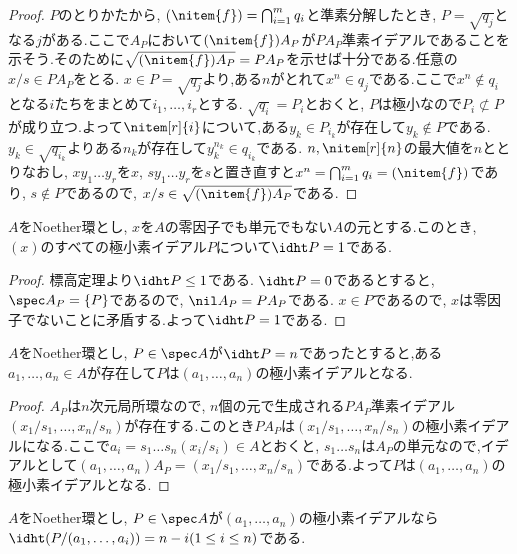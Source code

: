 \begin{proof}
	$P$のとりかたから, $(\nitem{f})=\bigcap_{i=1}^m q_i$と準素分解したとき, $P=\sqrt{q_j}$となる$j$がある.ここで$A_P$において$(\nitem{f})A_P$が$PA_P$準素イデアルであることを示そう.そのために$\sqrt{(\nitem{f})A_P}=PA_P$を示せば十分である.任意の$x/s\in PA_P$をとる. $x\in P=\sqrt{q_j}$より,ある$n$がとれて$x^n\in q_j$である.ここで$x^n\not\in q_i$となる$i$たちをまとめて$i_1,\dots,i_r$とする. $\sqrt{q_i}=P_i$とおくと, $P$は極小なので$P_i\not\subset P$が成り立つ.よって$\nitem[r]{i}$について,ある$y_k\in P_{i_k}$が存在して$y_k\not\in P$である. $y_k\in\sqrt{q_{i_k}}$よりある$n_k$が存在して$y_k^{n_k}\in q_{i_k}$である. $n,\nitem[r]{n}$の最大値を$n$ととりなおし, $xy_1\dots y_r$を$x$, $sy_1\dots y_r$を$s$と置き直すと$x^n=\bigcap_{i=1}^m q_i=(\nitem{f})$であり, $s\not\in P$であるので, $x/s\in\sqrt{(\nitem{f})A_P}$である.
\end{proof}

\begin{cor}
	$A$をNoether環とし, $x$を$A$の零因子でも単元でもない$A$の元とする.このとき, $(x)$のすべての極小素イデアル$P$について$\idht P=1$である.
\end{cor}

\begin{proof}
	標高定理より$\idht P\leq1$である. $\idht P=0$であるとすると, $\spec A_P=\{P\}$であるので, $\nil A_P=PA_P$である. $x\in P$であるので, $x$は零因子でないことに矛盾する.よって$\idht P=1$である.
\end{proof}

\begin{thm}[Krullの標高定理の逆]
	$A$をNoether環とし, $P\in\spec A$が$\idht P=n$であったとすると,ある$a_1,\dots,a_n\in A$が存在して$P$は$(a_1,\dots,a_n)$の極小素イデアルとなる.
\end{thm}

\begin{proof}
	$A_P$は$n$次元局所環なので, $n$個の元で生成される$PA_P$準素イデアル$(x_1/s_1,\dots,x_n/s_n)$が存在する.このとき$PA_P$は$(x_1/s_1,\dots,x_n/s_n)$の極小素イデアルになる.ここで$a_i=s_1\dots s_n(x_i/s_i)\in A$とおくと, $s_1\dots s_n$は$A_P$の単元なので,イデアルとして$(a_1,\dots,a_n)A_P=(x_1/s_1,\dots,x_n/s_n)$である.よって$P$は$(a_1,\dots,a_n)$の極小素イデアルとなる.
\end{proof}

\begin{prop}\label{prop:標高定理の系}
	$A$をNoether環とし, $P\in\spec A$が$(a_1,\dots,a_n)$の極小素イデアルなら$\idht (P/(a_1,\dots,a_i))=n-i (1\leq i\leq n)$である.
\end{prop}

